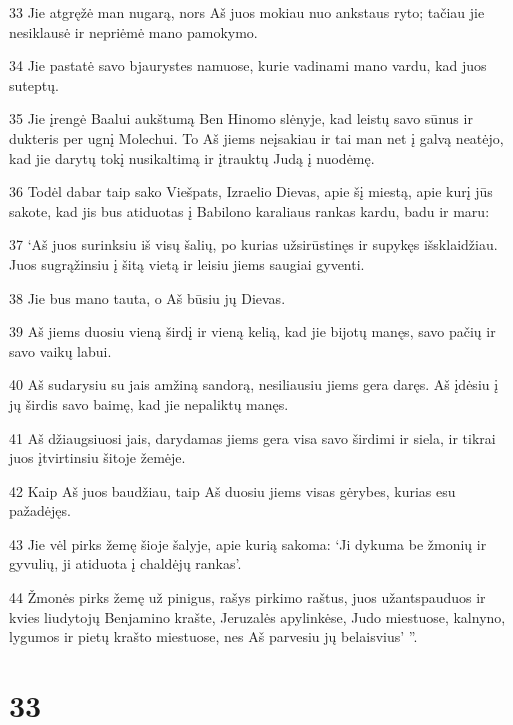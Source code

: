 \par 33 Jie atgręžė man nugarą, nors Aš juos mokiau nuo ankstaus ryto; tačiau jie nesiklausė ir nepriėmė mano pamokymo. 
\par 34 Jie pastatė savo bjaurystes namuose, kurie vadinami mano vardu, kad juos suteptų. 
\par 35 Jie įrengė Baalui aukštumą Ben Hinomo slėnyje, kad leistų savo sūnus ir dukteris per ugnį Molechui. To Aš jiems neįsakiau ir tai man net į galvą neatėjo, kad jie darytų tokį nusikaltimą ir įtrauktų Judą į nuodėmę. 
\par 36 Todėl dabar taip sako Viešpats, Izraelio Dievas, apie šį miestą, apie kurį jūs sakote, kad jis bus atiduotas į Babilono karaliaus rankas kardu, badu ir maru: 
\par 37 ‘Aš juos surinksiu iš visų šalių, po kurias užsirūstinęs ir supykęs išsklaidžiau. Juos sugrąžinsiu į šitą vietą ir leisiu jiems saugiai gyventi. 
\par 38 Jie bus mano tauta, o Aš būsiu jų Dievas. 
\par 39 Aš jiems duosiu vieną širdį ir vieną kelią, kad jie bijotų manęs, savo pačių ir savo vaikų labui. 
\par 40 Aš sudarysiu su jais amžiną sandorą, nesiliausiu jiems gera daręs. Aš įdėsiu į jų širdis savo baimę, kad jie nepaliktų manęs. 
\par 41 Aš džiaugsiuosi jais, darydamas jiems gera visa savo širdimi ir siela, ir tikrai juos įtvirtinsiu šitoje žemėje. 
\par 42 Kaip Aš juos baudžiau, taip Aš duosiu jiems visas gėrybes, kurias esu pažadėjęs. 
\par 43 Jie vėl pirks žemę šioje šalyje, apie kurią sakoma: ‘Ji dykuma be žmonių ir gyvulių, ji atiduota į chaldėjų rankas’. 
\par 44 Žmonės pirks žemę už pinigus, rašys pirkimo raštus, juos užantspauduos ir kvies liudytojų Benjamino krašte, Jeruzalės apylinkėse, Judo miestuose, kalnyno, lygumos ir pietų krašto miestuose, nes Aš parvesiu jų belaisvius’ ”.



\chapter{33}


